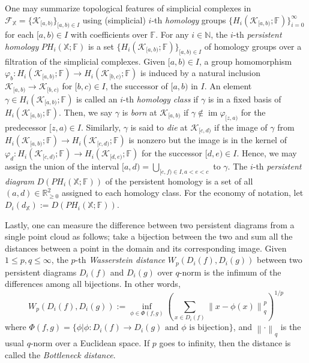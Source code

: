 \documentclass[11pt]{article}
\newcommand{\norm}[1]{\left\lVert#1\right\rVert}
\newcommand{\N}{\mathbb{N}} %
\newcommand{\R}{\mathbb{R}} %
\newcommand{\im}{\operatorname{im}}
\newcommand{\ptcloudx}{\mathbb{X}} %
\begin{document}
One may summarize topological features of simplicial complexes in $\mathcal{F}_{\ptcloudx}=\{ \mathcal{K}_{[a,b)} \}_{[a,b) \in I}$ using (simplicial) $i$-th \emph{homology} groups $\{H_{i}(\mathcal{K}_{[a,b)};\mathbb{F})\}_{i=0}^{\infty}$ for each $[a,b) \in I$ with coefficients over $\mathbb{F}$. For any $i \in \N$, the $i$-th \emph{persistent homology} $PH_{i}(\ptcloudx ; \mathbb{F})$ is a set $\{H_{i}(\mathcal{K}_{[a,b)};\mathbb{F})\}_{[a,b) \in I}$ of homology groups over a filtration of the simplicial complexes. Given $[a,b) \in I$, a group homomorphism $\varphi_{b}:H_{i}(\mathcal{K}_{[a,b)};\mathbb{F}) \to H_{i}(\mathcal{K}_{[b,c)};\mathbb{F})$ is induced by a natural inclusion $\mathcal{K}_{[a,b)} \to \mathcal{K}_{[b,c)}$ for $[b,c) \in I$, the successor of $[a,b)$ in $I$. An element $\gamma \in H_{i}(\mathcal{K}_{[a,b)};\mathbb{F})$ is called an $i$-th \emph{homology class} if $\gamma$ is in a fixed basis of $H_{i}(\mathcal{K}_{[a,b)};\mathbb{F})$. Then, we say $\gamma$ is \emph{born} at $\mathcal{K}_{[a,b)}$ if $\gamma \not\in \im\varphi_{[z,a)}$ for the predecessor $[z,a) \in I$. Similarly, $\gamma$ is said to \emph{die} at $\mathcal{K}_{[c,d)}$ if the image of $\gamma$ from $H_{i}(\mathcal{K}_{[a,b)};\mathbb{F}) \to H_{i}(\mathcal{K}_{[c,d)};\mathbb{F})$ is nonzero but the image is in the kernel of $\varphi_{d}: H_{i}(\mathcal{K}_{[c,d)};\mathbb{F}) \to H_{i}(\mathcal{K}_{[d,e)};\mathbb{F})$ for the successor $[d,e) \in I$. Hence, we may assign the union of the interval $[a,d)=\bigcup_{[e,f) \in I, a<e<c}$ to $\gamma$. The $i$-th \emph{persistent diagram} $D(PH_{i}(\ptcloudx ; \mathbb{F}))$ of the persistent homology is a set of all $(a,d) \in \R_{\geq 0}^{2}$ assigned to each homology class. For the economy of notation, let $D_{i}(d_{\ptcloudx}):=D(PH_{i}(\ptcloudx ; \mathbb{F}))$.

Lastly, one can measure the difference between two persistent diagrams from a single point cloud as follows; take a bijection between the two and sum all the distances between a point in the domain and its corresponding image. Given $1 \leq p,q \leq \infty$, the $p$-th \emph{Wasserstein distance} $W_{p}(D_{i}(f),D_{i}(g))$ between two persistent diagrams $D_{i}(f)$ and $D_{i}(g)$ over $q$-norm is the infimum of the differences among all bijections. In other words, $$W_{p}(D_{i}(f),D_{i}(g)) := \underset{\phi \in \Phi(f,g)}{\inf} \left( \sum_{x \in D_{i}(f)}\norm{x-\phi(x)}_{q}^{p}\right)^{1/p}$$
where $\Phi(f,g) = \lbrace \phi | \phi : D_{i}(f) \rightarrow D_{i}(g) \text{ and } \phi \text{  is bijection}\rbrace $, and $\norm{ \cdot}_{q}$ is the usual $q$-norm over a Euclidean space. If $p$ goes to infinity, then the distance is called the \emph{Bottleneck distance}. 
\end{document}
